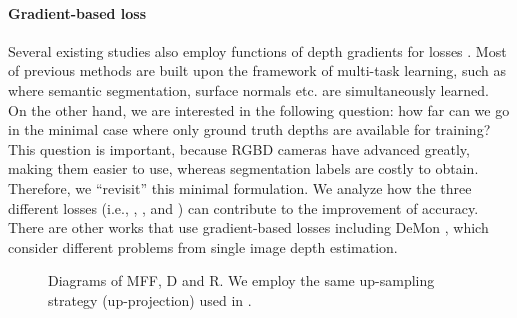 \documentclass[10pt,twocolumn,letterpaper]{article}
\begin{document}
\paragraph{Gradient-based loss} Several existing studies also employ functions of depth gradients for losses \cite{Eigen2015PredictingDS,ummenhofer2017demon}.
Most of previous methods are built upon the framework of multi-task learning, such as \cite{Eigen2015PredictingDS,wang2016surge} where semantic segmentation, surface normals etc. are simultaneously learned.
On the other hand, we are interested in the following question: how far can we go in the minimal case where only ground truth depths
are available for training? This question is important, because RGBD cameras have
advanced greatly, making them easier to use, whereas segmentation labels are costly to
obtain.
Therefore, we “revisit” this minimal
formulation. We
analyze how the three different losses (i.e., , , and ) can contribute to the
improvement of accuracy. There are other works that use gradient-based losses including DeMon \cite{ummenhofer2017demon}, which consider different problems from single image depth estimation.

\begin{figure}[ht]
\centering
{}
\caption{Diagrams of MFF, D and R. We employ the same up-sampling strategy (up-projection) used in \cite{laina2016deeper}.
} 
\label{fig_module}
\end{figure}
\end{document}
